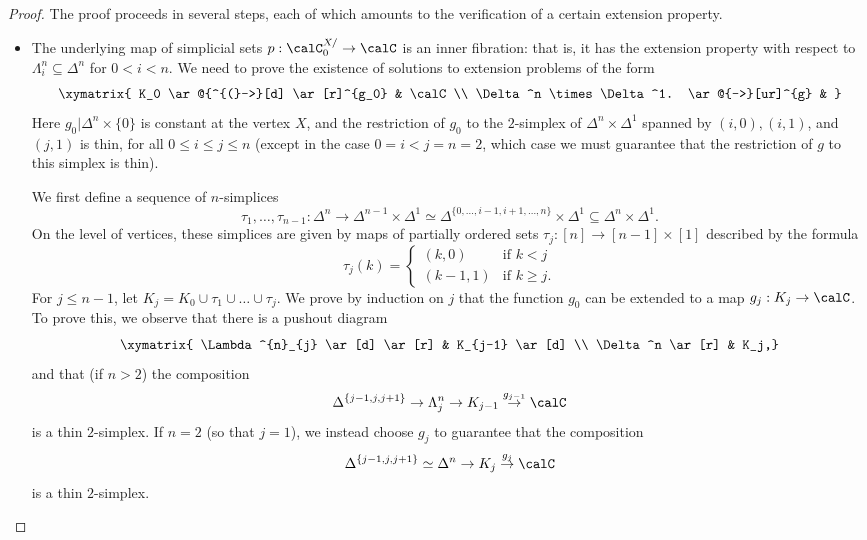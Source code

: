 \begin{proof}
The proof proceeds in several steps, each of which amounts to the verification of
a certain extension property. 

\begin{itemize}
\item[$(1)$] The underlying map of simplicial sets $p: \calC^{X/}_0 \rightarrow \calC$ is
an inner fibration: that is, it has the extension property with respect to 
$\Lambda^n_i \subseteq \Delta^n$ for $0 < i < n$. We need to prove the existence of solutions to extension problems of the form
$$ \xymatrix{ K_0 \ar@{^{(}->}[d] \ar[r]^{g_0} & \calC \\
\Delta^n \times \Delta^1. \ar@{-->}[ur]^{g} & }$$
Here $g_0 | \Delta^n \times \{0\}$ is constant at the vertex $X$, and the
restriction of $g_0$ to the $2$-simplex of $\Delta^n \times \Delta^1$ spanned by $(i,0), (i,1)$, and $(j,1)$ is thin, for all $0 \leq i \leq j \leq n$ (except in the case $0 = i < j = n = 2$, which case we must
guarantee that the restriction of $g$ to this simplex is thin).

We first define a sequence of $n$-simplices 
$$\tau_{1}, \ldots, \tau_{n-1}: \Delta^n \rightarrow \Delta^{n-1} \times \Delta^1
\simeq \Delta^{ \{0, \ldots, i-1, i+1, \ldots, n\} } \times \Delta^1 \subseteq \Delta^n \times \Delta^1.$$
On the level of vertices, these simplices are given by maps of partially ordered sets
$\tau_{j}: [n] \rightarrow [n-1] \times [1]$ described by the formula
$$ \tau_{j}(k) = \begin{cases} (k,0) & \text{if } k < j \\
(k-1,1) & \text{if } k \geq j. \end{cases}$$
For $j \leq n-1$, let $K_{j} = K_0 \cup \tau_{1} \cup \ldots \cup \tau_{j}$. 
We prove by induction on $j$ that the function $g_0$ can be extended to a map
$g_{j}: K_j \rightarrow \calC$. To prove this, we observe that there is a pushout diagram
$$ \xymatrix{ \Lambda^{n}_{j} \ar[d] \ar[r] & K_{j-1} \ar[d] \\
\Delta^n \ar[r] & K_j,}$$
and that (if $n > 2$) the composition
$$ \Delta^{ \{j-1,j,j+1\}} \rightarrow \Lambda^n_j \rightarrow K_{j-1} \stackrel{g_{j-1}}{\rightarrow} \calC$$
is a thin $2$-simplex. If $n=2$ (so that $j=1$), we instead choose $g_{j}$ to guarantee that the composition
$$ \Delta^{ \{j-1,j,j+1\}} \simeq \Delta^n \rightarrow K_{j} \stackrel{g_{j}}{\rightarrow} \calC$$
is a thin $2$-simplex.


\end{itemize}
\end{proof}
